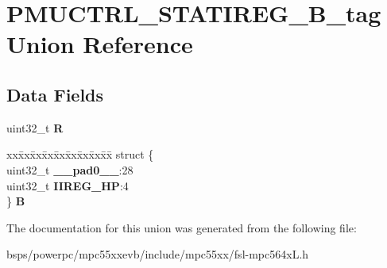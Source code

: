\hypertarget{unionPMUCTRL__STATIREG__32B__tag}{}\section{P\+M\+U\+C\+T\+R\+L\+\_\+\+S\+T\+A\+T\+I\+R\+E\+G\+\_\+B\+\_\+tag Union Reference}
\label{unionPMUCTRL__STATIREG__32B__tag}
\subsection*{Data Fields}
\begin{DoxyCompactItemize}
\item 
\mbox{\label{unionPMUCTRL__STATIREG__32B__tag_a8d5b3db5f60cbfe1f1d3ff09d2c46ddd}} 
uint32\+\_\+t {\bfseries R}
\item 
\mbox{\label{unionPMUCTRL__STATIREG__32B__tag_a241c916d12ad6c3f388c3a4c9679eb93}} 
\begin{tabbing}
xx\=xx\=xx\=xx\=xx\=xx\=xx\=xx\=xx\=\kill
struct \{\\
\>uint32\_t {\bfseries \_\_pad0\_\_}:28\\
\>uint32\_t {\bfseries IIREG\_HP}:4\\
\} {\bfseries B}\\

\end{tabbing}\end{DoxyCompactItemize}


The documentation for this union was generated from the following file\+:\begin{DoxyCompactItemize}
\item 
bsps/powerpc/mpc55xxevb/include/mpc55xx/fsl-\/mpc564x\+L.\+h\end{DoxyCompactItemize}
